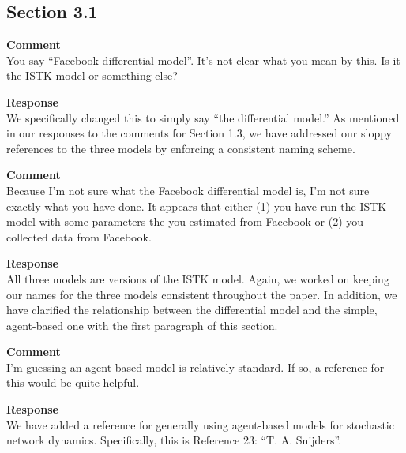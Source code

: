 \subsection{Section 3.1}
\setcounter{rev2-3.1}{1}

\textbf{Comment } \\
You say ``Facebook differential model''.
It's not clear what you mean by this.
Is it the ISTK model or something else?

\textbf{Response } \\
We specifically changed this to simply say ``the differential model.''
As mentioned in our responses to the comments for Section 1.3, we have addressed our sloppy references to the three models by enforcing a consistent naming scheme.

\textbf{Comment } \\
Because I'm not sure what the Facebook differential model is, I'm not sure exactly what you have done.
It appears that either (1) you have run the ISTK model with some parameters the you estimated from Facebook or (2) you collected data from Facebook.

\textbf{Response } \\
All three models are versions of the ISTK model.
Again, we worked on keeping our names for the three models consistent throughout the paper.
In addition, we have clarified the relationship between the differential model and the simple, agent-based one with the first paragraph of this section.

\textbf{Comment } \\
I'm guessing an agent-based model is relatively standard.
If so, a reference for this would be quite helpful.

\textbf{Response } \\
We have added a reference for generally using agent-based models for stochastic network dynamics.
Specifically, this is Reference 23: ``T. A. Snijders''.

